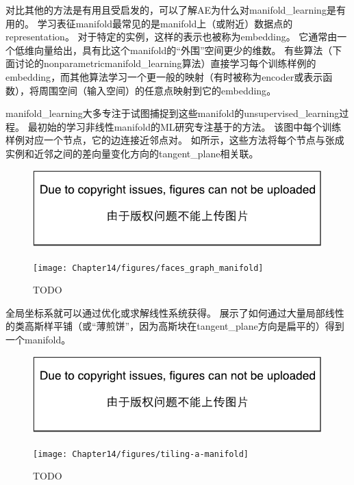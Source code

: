 
对比其他的方法是有用且受启发的，可以了解\gls{AE}为什么对\gls{manifold_learning}是有用的。
学习表征\gls{manifold}最常见的是\gls{manifold}上（或附近）数据点的\gls{representation}。
对于特定的实例，这样的表示也被称为\gls{embedding}。
它通常由一个低维向量给出，具有比这个\gls{manifold}的``外围''空间更少的维数。
有些算法（下面讨论的\gls{nonparametric}\gls{manifold_learning}算法）直接学习每个训练样例的\gls{embedding}，而其他算法学习一个更一般的映射（有时被称为\gls{encoder}或表示函数），将周围空间（输入空间）的任意点映射到它的\gls{embedding}。


\gls{manifold_learning}大多专注于试图捕捉到这些\gls{manifold}的\gls{unsupervised_learning}过程。
最初始的学习非线性\gls{manifold}的\gls{ML}研究专注基于的方法。
该图中每个训练样例对应一个节点，它的边连接近邻点对。
如所示，这些方法\citep{Scholkopf98,Roweis2000-lle-small,Tenenbaum2000-isomap,Brand2003-small,Belkin+Niyogi-2003,Donoho+Carrie-03,Weinberger04a-small,SNE-nips15-small,VanDerMaaten08-small}将每个节点与张成实例和近邻之间的差向量变化方向的\gls{tangent_plane}相关联。

\begin{figure}[!htb]
\ifOpenSource
\centerline{\includegraphics{figure.pdf}}
\else
\centerline{\texttt{[image: Chapter14/figures/faces\_graph\_manifold]}}
\fi
\caption{TODO}
\label{fig:chap14_faces_graph_manifold}
\end{figure}

全局坐标系就可以通过优化或求解线性系统获得。
展示了如何通过大量局部线性的类高斯样平铺（或``薄煎饼''，因为高斯块在\gls{tangent_plane}方向是扁平的）得到一个\gls{manifold}。

\begin{figure}[!htb]
\ifOpenSource
\centerline{\includegraphics{figure.pdf}}
\else
\centerline{\texttt{[image: Chapter14/figures/tiling-a-manifold]}}
\fi
\caption{TODO}
\label{fig:chap14_tiling-a-manifold}
\end{figure}

